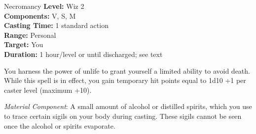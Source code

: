 {Necromancy}
{
	\textbf{Level:}
	Wiz 2\\
	\textbf{Components:}
	V, S, M\\
	\textbf{Casting Time:}
	1 standard action\\
	\textbf{Range:}
	Personal\\
	\textbf{Target:}
	You\\
	\textbf{Duration:}
	1 hour/level or until discharged; see text\\
}
{
	You harness the power of unlife to grant yourself a limited ability to avoid death. While this spell is in effect, you gain temporary hit points equal to 1d10 +1 per caster level (maximum +10).

	\textit{Material Component}:
	A small amount of alcohol or distilled spirits, which you use to trace certain sigils on your body during casting. These sigils cannot be seen once the alcohol or spirits evaporate.

}

